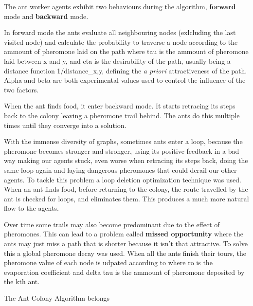 \documentclass[times, 10pt,twocolumn]{article}
\begin{document}
	 

The ant worker agents exhibit two behaviours during the algorithm, \textbf{forward} mode and \textbf{backward} mode. 


In forward mode the ants evaluate all neighbouring nodes (exlcluding the last visited node) and calculate the probability to traverse a node according to the ammount of pheromone laid on the path
where tau is the ammount of pheromone laid between x and y, and eta is the desirability of the path, usually being a distance function 1/distance\_{x,y}, defining the \textit{a priori} attractiveness of the path. Alpha and beta are both experimental values used to control the influence of the two factors.


When the ant finds food, it enter backward mode. It starts retracing its steps back to the colony leaving a pheromone trail behind. The ants do this multiple times until they converge into a solution.

With the immense diversity of graphs, sometimes ants enter a loop, because the pheromone becomes stronger and stronger, using its positive feedback in a bad way making our agents stuck, even worse when retracing its steps back, doing the same loop again and laying dangerous pheromones that could derail our other agents. To tackle this problem a loop deletion optimization technique was used. When an ant finds food, before returning to the colony, the route travelled by the ant is checked for loops, and eliminates them. This produces a much more natural flow to the agents.

Over time some trails may also become predominant due to the effect of pheromones. This can lead to a problem called \textbf{missed opportunity} where the ants may just miss a path that is shorter because it isn't that attractive. To solve this a global pheromone decay was used. When all the ants finish their tours, the pheromone value of each node is udpated according to 
where ro is the evaporation coefficient and delta tau is the ammount of pheromone deposited by the kth ant.



	The Ant Colony Algorithm belongs 
	
\end{document}
